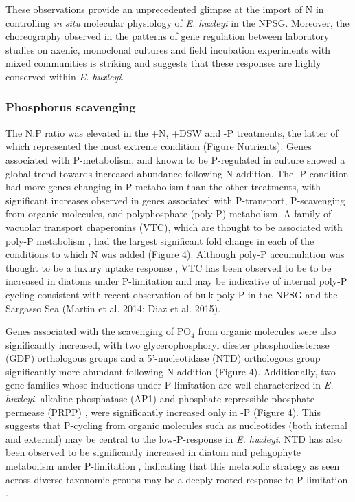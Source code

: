 These observations provide an unprecedented glimpse at the import of N in controlling \textit{in situ} molecular physiology of \textit{E. huxleyi} in the NPSG. Moreover, the choreography observed in the patterns of gene regulation between laboratory studies on axenic, monoclonal cultures and field incubation experiments with mixed communities is striking and suggests that these responses are highly conserved within \textit{E. huxleyi}. \par


\subsubsection{Phosphorus scavenging}

The N:P ratio was elevated in the +N, +DSW and -P treatments, the latter of which represented the most extreme condition (Figure Nutrients). Genes associated with P-metabolism, and known to be P-regulated in culture \citep{Dyhrman2006, McKew2015} showed a global trend towards increased abundance following N-addition. The -P condition had more genes changing in P-metabolism than the other treatments, with significant increases observed in genes associated with P-transport, P-scavenging from organic molecules, and polyphosphate (poly-P) metabolism. A family of vacuolar transport chaperonins (VTC), which are thought to be associated with poly-P metabolism \citep{Ogawa2000, Hothorn2009, Dyhrman2012}, had the largest significant fold change in each of the conditions to which N was added (Figure 4). Although poly-P accumulation was thought to be a luxury uptake response \citep{Perry1976}, VTC has been observed to be to be increased in diatoms under P-limitation \citep{Dyhrman2006, Dyhrman2012} and may be indicative of internal poly-P cycling consistent with recent observation of bulk poly-P in the NPSG and the Sargasso Sea (Martin et al. 2014; Diaz et al. 2015). \par

Genes associated with the scavenging of PO$_4$ from organic molecules were also significantly increased, with two glycerophosphoryl diester phosphodiesterase (GDP) orthologous groups and a 5'-nucleotidase (NTD) orthologous group significantly more abundant following N-addition (Figure 4). Additionally, two gene families whose inductions under P-limitation are well-characterized in \textit{E. huxleyi}, alkaline phosphatase (AP1) \citep{Xu2006} and phosphate-repressible phosphate permease (PRPP) \citep{Chung2003, Dyhrman2003, Dyhrman2006}, were significantly increased only in -P (Figure 4). This suggests that P-cycling from organic molecules such as nucleotides (both internal and external) may be central to the low-P-response in \textit{E. huxleyi}. NTD has also been observed to be significantly increased in diatom and pelagophyte metabolism under P-limitation \citep{Wurch2011a, Dyhrman2012}, indicating that this metabolic strategy as seen across diverse taxonomic groups may be a deeply rooted response to P-limitation \citep{Martiny2013}.\par

